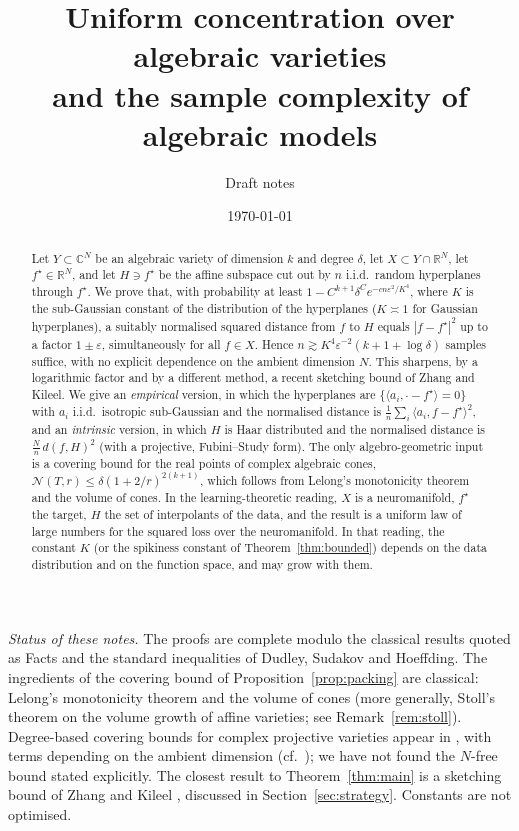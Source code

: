 \documentclass[11pt]{article}
\title{Uniform concentration over algebraic varieties\\ and the sample complexity of algebraic models}
\author{Draft notes}
\date{\today}
\theoremstyle{definition}
\numberwithin{equation}{section}
\newcommand{\R}{\mathbb{R}}
\newcommand{\C}{\mathbb{C}}
\newcommand{\eps}{\varepsilon}
\newcommand{\fs}{f^{\star}}
\newcommand{\cN}{\mathcal{N}}
\begin{document}
\maketitle

\begin{abstract}
Let $Y\subset\C^N$ be an algebraic variety of dimension $k$ and degree $\delta$, let $X\subset Y\cap\R^N$, let $\fs\in\R^N$, and let $H\ni\fs$ be the affine subspace cut out by $n$ i.i.d.\ random hyperplanes through $\fs$. We prove that, with probability at least $1-C^{k+1}\delta^{C}e^{-cn\eps^2/K^4}$, where $K$ is the sub-Gaussian constant of the distribution of the hyperplanes ($K\asymp1$ for Gaussian hyperplanes), a suitably normalised squared distance from $f$ to $H$ equals $|f-\fs|^2$ up to a factor $1\pm\eps$, simultaneously for all $f\in X$. Hence $n\gtrsim K^4\eps^{-2}(k+1+\log\delta)$ samples suffice, with no explicit dependence on the ambient dimension $N$. This sharpens, by a logarithmic factor and by a different method, a recent sketching bound of Zhang and Kileel. We give an \emph{empirical} version, in which the hyperplanes are $\{\langle a_i,\cdot-\fs\rangle=0\}$ with $a_i$ i.i.d.\ isotropic sub-Gaussian and the normalised distance is $\frac1n\sum_i\langle a_i,f-\fs\rangle^2$, and an \emph{intrinsic} version, in which $H$ is Haar distributed and the normalised distance is $\frac Nn\,d(f,H)^2$ (with a projective, Fubini--Study form). The only algebro-geometric input is a covering bound for the real points of complex algebraic cones, $\cN(T,r)\le\delta(1+2/r)^{2(k+1)}$, which follows from Lelong's monotonicity theorem and the volume of cones. In the learning-theoretic reading, $X$ is a neuromanifold, $\fs$ the target, $H$ the set of interpolants of the data, and the result is a uniform law of large numbers for the squared loss over the neuromanifold. In that reading, the constant $K$ (or the spikiness constant of Theorem~\ref{thm:bounded}) depends on the data distribution and on the function space, and may grow with them.
\end{abstract}

\noindent\emph{Status of these notes.} The proofs are complete modulo the classical results quoted as Facts and the standard inequalities of Dudley, Sudakov and Hoeffding. The ingredients of the covering bound of Proposition~\ref{prop:packing} are classical: Lelong's monotonicity theorem and the volume of cones (more generally, Stoll's theorem on the volume growth of affine varieties; see Remark~\ref{rem:stoll}). Degree-based covering bounds for complex projective varieties appear in \cite{BurgisserCucker}, with terms depending on the ambient dimension (cf.\ \cite[Table~1]{ZhangKileel}); we have not found the $N$-free bound stated explicitly. The closest result to Theorem~\ref{thm:main} is a sketching bound of Zhang and Kileel \cite{ZhangKileel25}, discussed in Section~\ref{sec:strategy}. Constants are not optimised.
\end{document}
